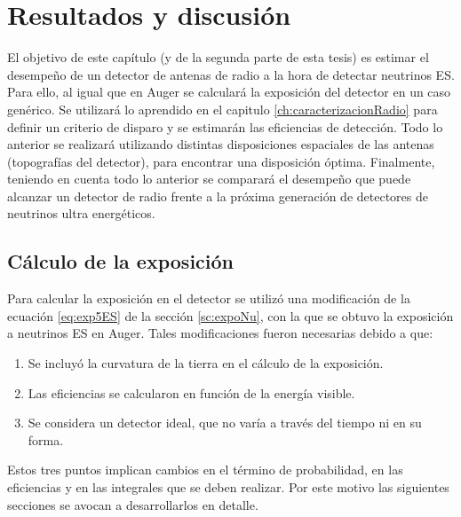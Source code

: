 \chapter{Resultados y discusi\'on}
\label{ch:resultadosRadio}

El objetivo de este cap\'itulo (y de la segunda parte de esta tesis) es estimar el desempe\~no  de un detector de antenas de radio a la hora de detectar neutrinos ES.
Para ello, al igual que en Auger se calcular\'a la exposici\'on del detector en un caso gen\'erico.
Se utilizar\'a lo aprendido en el capitulo \ref{ch:caracterizacionRadio} para definir un criterio de disparo y se estimar\'an las eficiencias de detecci\'on.
Todo lo anterior se realizar\'a utilizando distintas disposiciones espaciales de las antenas (topograf\'ias del detector), para encontrar una disposici\'on \'optima.
Finalmente, teniendo en cuenta todo lo anterior se comparar\'a el desempe\~no que puede alcanzar un detector de radio frente a la pr\'oxima generaci\'on de detectores de neutrinos ultra energ\'eticos.

\section{C\'alculo de la exposici\'on}
	
	Para calcular la exposici\'on en el detector se utiliz\'o una modificaci\'on de la ecuaci\'on \ref{eq:exp5ES} de la secci\'on \ref{sc:expoNu}, con la que se obtuvo la exposici\'on a neutrinos ES en Auger.
	Tales modificaciones fueron necesarias debido a que:
	\begin{enumerate}
	 \item Se incluy\'o la curvatura de la tierra en el c\'alculo de la exposici\'on.
	 \item Las eficiencias se calcularon en funci\'on de la energ\'ia visible.
	 \item Se considera un detector ideal, que no var\'ia a trav\'es del tiempo ni en su forma.
	\end{enumerate}
	Estos tres puntos implican cambios en el t\'ermino de probabilidad, en las eficiencias y en las integrales que se deben realizar.
	Por este motivo las siguientes secciones se avocan a desarrollarlos en detalle.
	

